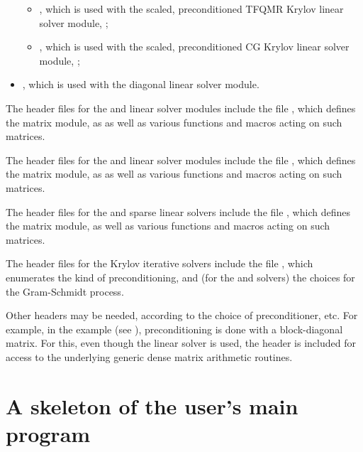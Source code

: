 \begin{itemize}
\begin{itemize}
  \item {},
    which is used with the scaled, preconditioned TFQMR Krylov linear
    solver module, {\sunlinsolsptfqmr};

  \item {},
    which is used with the scaled, preconditioned CG Krylov linear
    solver module, {\sunlinsolpcg};
  \end{itemize}
\item {},
  which is used with the {\cvdiag} diagonal linear solver module.
\end{itemize}

The header files for the {\sunlinsoldense} and {\sunlinsollapdense}
linear solver modules include the file
, which defines the {\sunmatdense}
matrix module, as as well as various functions and macros acting on
such matrices.

The header files for the {\sunlinsolband} and {\sunlinsollapband}
linear solver modules include the file
, which defines the {\sunmatband}
matrix module, as as well as various functions and macros acting on
such matrices.

The header files for the {\sunlinsolklu} and {\sunlinsolslumt}
sparse linear solvers include the file
, which defines the {\sunmatsparse}
matrix module, as well as various functions and macros acting on such
matrices.

The header files for the Krylov iterative solvers include the file
, which enumerates the kind of
preconditioning, and (for the {\spgmr} and {\spfgmr} solvers) the
choices for the Gram-Schmidt process.

Other headers may be needed, according to the choice of
preconditioner, etc.  For example, in the 
example (see \cite{cvode_ex}), preconditioning is done with a
block-diagonal matrix. For this, even though the {\sunlinsolspgmr}
linear solver is used, the header  is
included for access to the underlying generic dense matrix arithmetic
routines.

\section{A skeleton of the user's main program}\label{ss:skeleton_sim}

